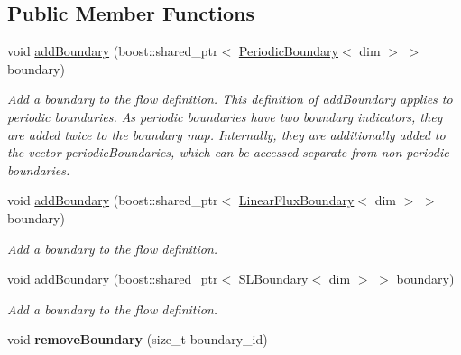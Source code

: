\subsection*{Public Member Functions}
\begin{DoxyCompactItemize}
\item 
void \hyperlink{classnatrium_1_1BoundaryCollection_a9f957b5338bca01c7bd8c21576ec922c}{addBoundary} (boost::shared\_\-ptr$<$ \hyperlink{classnatrium_1_1PeriodicBoundary}{PeriodicBoundary}$<$ dim $>$ $>$ boundary)
\begin{DoxyCompactList}\small\item\em Add a boundary to the flow definition. This definition of addBoundary applies to periodic boundaries. As periodic boundaries have two boundary indicators, they are added twice to the boundary map. Internally, they are additionally added to the vector periodicBoundaries, which can be accessed separate from non-\/periodic boundaries. \item\end{DoxyCompactList}\item 
void \hyperlink{classnatrium_1_1BoundaryCollection_aa248c47170036538ef052940123b2322}{addBoundary} (boost::shared\_\-ptr$<$ \hyperlink{classnatrium_1_1LinearFluxBoundary}{LinearFluxBoundary}$<$ dim $>$ $>$ boundary)
\begin{DoxyCompactList}\small\item\em Add a boundary to the flow definition. \item\end{DoxyCompactList}\item 
void \hyperlink{classnatrium_1_1BoundaryCollection_a7eb369274f50a3e671cd8cd98e1cff68}{addBoundary} (boost::shared\_\-ptr$<$ \hyperlink{classnatrium_1_1SLBoundary}{SLBoundary}$<$ dim $>$ $>$ boundary)
\begin{DoxyCompactList}\small\item\em Add a boundary to the flow definition. \item\end{DoxyCompactList}\item 
\hypertarget{classnatrium_1_1BoundaryCollection_ad3992eb9a0e11aa894937ba062560861}{
void {\bfseries removeBoundary} (size\_\-t boundary\_\-id)}
\label{classnatrium_1_1BoundaryCollection_ad3992eb9a0e11aa894937ba062560861}


\end{DoxyCompactItemize}
